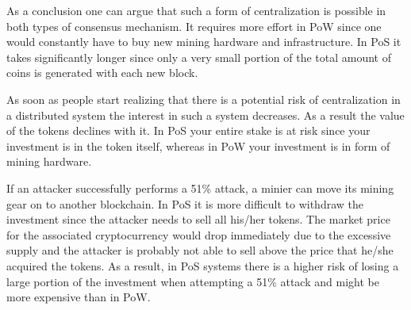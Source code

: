 As a conclusion one can argue that such a form of centralization is possible in both types of consensus mechanism. It requires more effort in PoW since one would constantly have to buy new mining hardware and infrastructure. In PoS it takes significantly longer since only a very small portion of the total amount of coins is generated with each new block. 

As soon as people start realizing that there is a potential risk of centralization in a distributed system the interest in such a system decreases. As a result the value of the tokens declines with it. In PoS your entire stake is at risk since your investment is in the token itself, whereas in PoW your investment is in form of mining hardware. 

If an attacker successfully performs a 51\% attack, a minier can move its mining gear on to another blockchain. In PoS it is more difficult to withdraw the investment since the attacker needs to sell all his/her tokens. The market price for the associated cryptocurrency would drop immediately due to the excessive supply and the attacker is probably not able to sell above the price that he/she acquired the tokens. As a result, in PoS systems there is a higher risk of losing a large portion of the investment when attempting a 51\% attack and might be more expensive than in PoW. 
